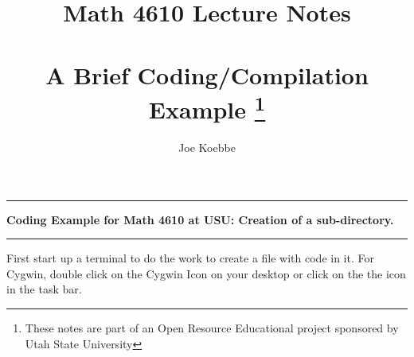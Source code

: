 \documentclass[10pt,fleqn]{article}
\title{Math 4610 Lecture Notes \\
            \ \\
       A Brief Coding/Compilation Example
  \footnote{These notes are part of an Open Resource Educational project
            sponsored by Utah State University}}
\author{Joe Koebbe}
\begin{document}
\maketitle
\newpage

\vskip0.1in\hrule\vskip0.1in
\noindent
{\bf Coding Example for Math 4610 at USU: Creation of a sub-directory.} 
\vskip0.1in\hrule\vskip0.1in
\noindent
First start up a terminal to do the work to create a file with code in it. For
Cygwin, double click on the Cygwin Icon on your desktop or click on the the
icon in the task bar.
\end{document}
